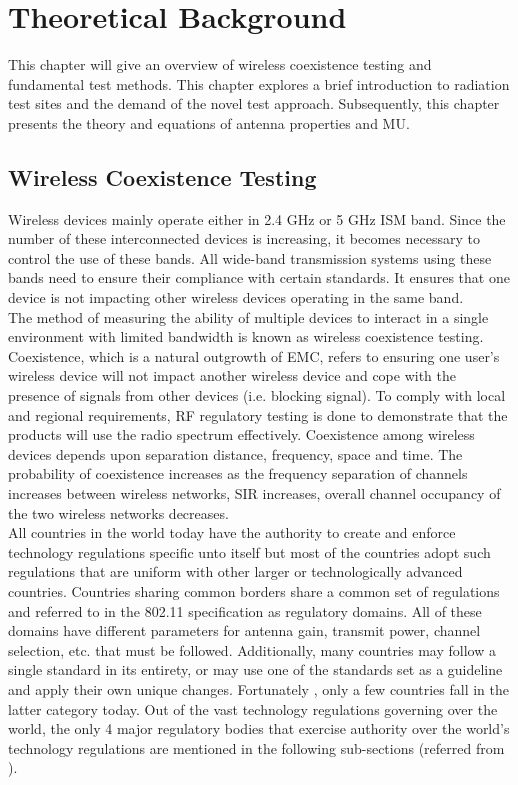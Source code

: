 \chapter{Theoretical Background}\label{chap:theorie}

This chapter will give an overview of wireless coexistence testing and fundamental test methods. This chapter explores a brief introduction to radiation test sites and the demand of the novel test approach. Subsequently,
this chapter presents the theory and equations of antenna properties and \acf{MU}.

\section{ Wireless Coexistence Testing  } 
Wireless devices mainly operate either in 2.4 GHz or 5 GHz \acf{ISM} band. Since the number of these interconnected devices is increasing, it becomes necessary to control the use of these bands. All wide-band transmission systems using these bands need to ensure their compliance with certain standards.  It ensures that one device is not impacting other wireless devices operating in the same band. \\

The method of measuring the ability of multiple devices to interact in a single environment with limited bandwidth is known as wireless coexistence testing. Coexistence, which is a natural outgrowth of \acf{EMC}, refers to ensuring one user's wireless device will not impact another wireless device and cope with the presence of signals from other devices (i.e. blocking signal). To comply with local and regional requirements, \acs{RF} regulatory testing is done to demonstrate that the products will use the radio spectrum effectively. Coexistence among wireless devices depends upon separation distance, frequency, space and time. The probability of coexistence increases as the frequency separation of channels increases between wireless networks, \acf{SIR} increases, overall channel occupancy of the two wireless networks decreases. \\

All countries in the world today have the authority to create and enforce technology regulations specific unto itself but most of the countries adopt such regulations that are uniform with other larger or technologically advanced countries. Countries sharing common borders share a common set of regulations and referred to in the 802.11 specification as regulatory domains. All of these domains have different parameters for antenna gain, transmit power, channel selection, etc. that must be followed. Additionally, many countries may follow a single standard in its entirety, or may use one of the standards set as a guideline and apply their own unique changes. Fortunately , only a few countries fall in the latter category today. Out of the vast technology regulations governing over the world, the only 4 major regulatory bodies that exercise authority over the world's technology regulations are mentioned in the following sub-sections (referred from \cite{ppr_2020}).

